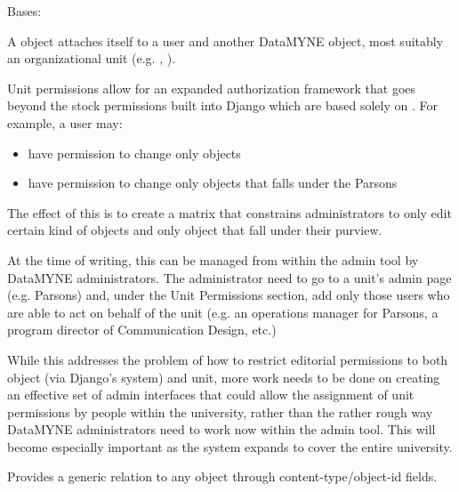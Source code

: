 \documentclass[letterpaper,10pt,english]{sphinxmanual}
\begin{document}

\begin{fulllineitems}
\label{generated/apps.profiles.models:apps.profiles.models.UnitPermission}
Bases: 

A  object attaches itself to a user and another DataMYNE
object, most suitably an organizational unit (e.g. , ).

Unit permissions allow for an expanded authorization framework that goes
beyond the stock permissions built into Django which are based solely on
.  For example, a user may:
\begin{itemize}
\item {} 
have permission to change only  objects

\item {} 
have permission to change only objects that falls under the Parsons 

\end{itemize}

The effect of this is to create a matrix that constrains administrators to
only edit certain kind of objects and only object that fall under their
purview.

At the time of writing, this can be managed from within the admin tool by
DataMYNE administrators.  The administrator need to go to a unit's admin
page (e.g. Parsons) and, under the Unit Permissions section, add only those
users who are able to act on behalf of the unit (e.g. an operations manager
for Parsons, a program director of Communication Design, etc.)

While this addresses the problem of how to restrict editorial permissions
to both object (via Django's system) and unit, more work needs to be done
on creating an effective set of admin interfaces that could allow the 
assignment of unit permissions by people within the university, rather
than the rather rough way DataMYNE administrators need to work now
within the admin tool.  This will become especially important as the
system expands to cover the entire university.


\begin{fulllineitems}
\label{generated/apps.profiles.models:apps.profiles.models.UnitPermission.content_object}
Provides a generic relation to any object through content-type/object-id
fields.

\end{fulllineitems}


\end{fulllineitems}
\end{document}
